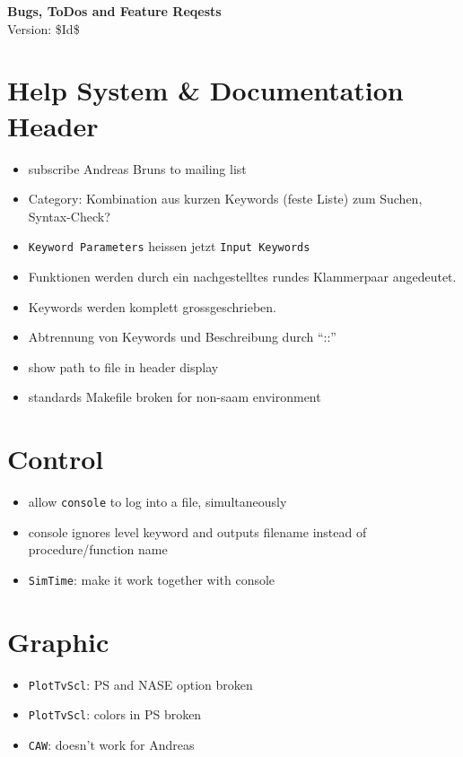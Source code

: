 \documentclass[12pt]{article}
\begin{document}
\begin{center}
{\Huge\textbf{Bugs, ToDos and Feature Reqests}}\\[2cm]
Version: \$Id$ $\$ 
\end{center}

\section{Help System \& Documentation Header} 

\begin{itemize}
\item subscribe Andreas Bruns to mailing list
\item Category: Kombination aus kurzen Keywords (feste Liste) zum Suchen, Syntax-Check?
\item \texttt{Keyword Parameters} heissen jetzt \texttt{Input Keywords}
\item Funktionen werden durch ein nachgestelltes rundes Klammerpaar angedeutet.
\item Keywords werden komplett grossgeschrieben. 
\item Abtrennung von Keywords und Beschreibung durch ``::''
\item show path to file in header display
\item standards Makefile broken for non-saam environment
\end{itemize}



\section{Control}
\begin{itemize}
\item allow \texttt{console} to log into a file, simultaneously
\item console ignores level keyword and outputs filename instead of procedure/function name
\item \texttt{SimTime}: make it work together with console
\end{itemize}


\section{Graphic}
\begin{itemize}
\item \texttt{PlotTvScl}: PS and NASE option broken
\item \texttt{PlotTvScl}: colors in PS broken
\item \texttt{CAW}: doesn't work for Andreas
\end{itemize}
\end{document}
